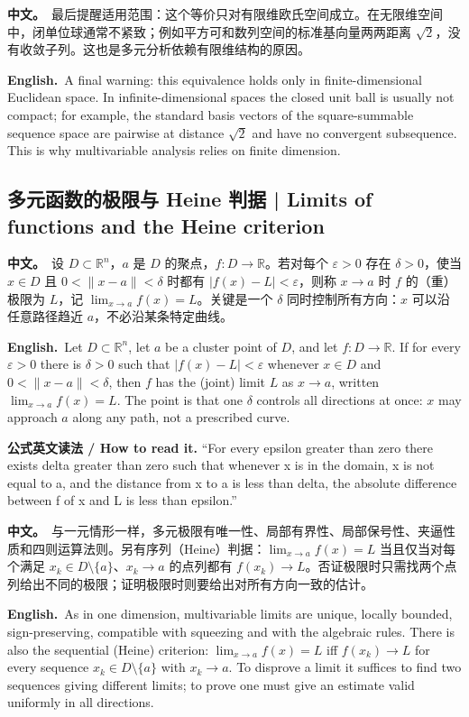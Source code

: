 \documentclass[UTF8,11pt,a4paper]{ctexart}
\newcommand{\BOTH}[2]{\par\noindent\textbf{中文。}\ #1\par\noindent\textbf{English.}\ #2\par}
\newcommand{\READ}[1]{\par\noindent\textbf{公式英文读法 / How to read it.} #1\par}
\begin{document}
\BOTH{最后提醒适用范围：这个等价只对有限维欧氏空间成立。在无限维空间中，闭单位球通常不紧致；例如平方可和数列空间的标准基向量两两距离 $\sqrt2$，没有收敛子列。这也是多元分析依赖有限维结构的原因。}{A final warning: this equivalence holds only in finite-dimensional Euclidean space. In infinite-dimensional spaces the closed unit ball is usually not compact; for example, the standard basis vectors of the square-summable sequence space are pairwise at distance $\sqrt2$ and have no convergent subsequence. This is why multivariable analysis relies on finite dimension.}

\subsection{多元函数的极限与 Heine 判据 | Limits of functions and the Heine criterion}
\BOTH{设 $D\subset\mathbb R^n$，$a$ 是 $D$ 的聚点，$f:D\to\mathbb R$。若对每个 $\varepsilon>0$ 存在 $\delta>0$，使当 $x\in D$ 且 $0<\|x-a\|<\delta$ 时都有 $|f(x)-L|<\varepsilon$，则称 $x\to a$ 时 $f$ 的（重）极限为 $L$，记 $\lim_{x\to a}f(x)=L$。关键是一个 $\delta$ 同时控制所有方向：$x$ 可以沿任意路径趋近 $a$，不必沿某条特定曲线。}{Let $D\subset\mathbb R^n$, let $a$ be a cluster point of $D$, and let $f:D\to\mathbb R$. If for every $\varepsilon>0$ there is $\delta>0$ such that $|f(x)-L|<\varepsilon$ whenever $x\in D$ and $0<\|x-a\|<\delta$, then $f$ has the (joint) limit $L$ as $x\to a$, written $\lim_{x\to a}f(x)=L$. The point is that one $\delta$ controls all directions at once: $x$ may approach $a$ along any path, not a prescribed curve.}
\READ{“For every epsilon greater than zero there exists delta greater than zero such that whenever x is in the domain, x is not equal to a, and the distance from x to a is less than delta, the absolute difference between f of x and L is less than epsilon.”}
\BOTH{与一元情形一样，多元极限有唯一性、局部有界性、局部保号性、夹逼性质和四则运算法则。另有序列（Heine）判据：$\lim_{x\to a}f(x)=L$ 当且仅当对每个满足 $x_k\in D\setminus\{a\}$、$x_k\to a$ 的点列都有 $f(x_k)\to L$。否证极限时只需找两个点列给出不同的极限；证明极限时则要给出对所有方向一致的估计。}{As in one dimension, multivariable limits are unique, locally bounded, sign-preserving, compatible with squeezing and with the algebraic rules. There is also the sequential (Heine) criterion: $\lim_{x\to a}f(x)=L$ iff $f(x_k)\to L$ for every sequence $x_k\in D\setminus\{a\}$ with $x_k\to a$. To disprove a limit it suffices to find two sequences giving different limits; to prove one must give an estimate valid uniformly in all directions.}
\end{document}
